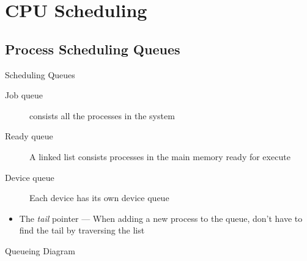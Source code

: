 \begin{frame}
  \begin{refsection}
    \nocite{wiki:ipc, wiki:semaphore}
    \printbibliography[heading=none]
  \end{refsection}
\end{frame}


\section{CPU Scheduling}
\label{sec:cpu-scheduling}

\subsection{Process Scheduling Queues}
\label{sec:proc-sched-queu}

\begin{frame}{Scheduling Queues}
  \begin{description}
  \item[Job queue] consists all the processes in the system
  \item[Ready queue] A linked list consists processes in the main memory ready for execute
  \item[Device queue] Each device has its own device queue
  \end{description}
\end{frame}

\begin{frame}
  \begin{center}
  \end{center}
\end{frame}

\begin{itemize}
\item The \emph{tail} pointer --- When adding a new process to the queue, don't have
    to find the tail by traversing the list
\end{itemize}

\begin{frame}{Queueing Diagram}
  \begin{center}
  \end{center}
\end{frame}

